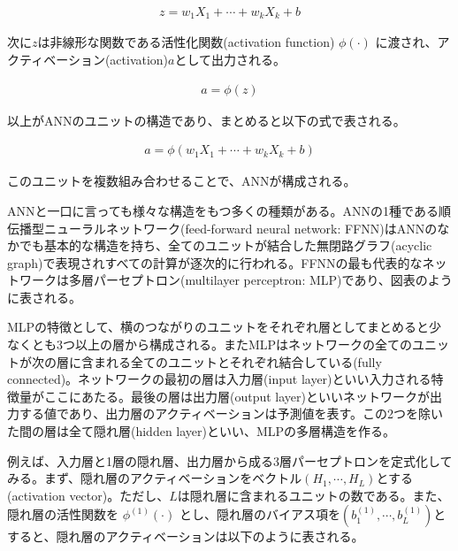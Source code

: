 \documentclass[a4paper, 12pt]{jsreport}
\begin{document}
\begin{equation}
  \begin{split}
    z = w_1 X_1 + \cdots + w_k X_k + b
  \end{split}
\end{equation}

次に$z$は非線形な関数である活性化関数(activation function) $\phi(\cdot)$ に渡され、アクティベーション(activation)$a$として出力される。

\begin{equation}
  \begin{split}
    a = \phi(z)
  \end{split}
\end{equation}

以上がANNのユニットの構造であり、まとめると以下の式で表される。

\begin{equation}
  \begin{split}
    a = \phi(w_1 X_1 + \cdots + w_k X_k + b)
  \end{split}
\end{equation}


このユニットを複数組み合わせることで、ANNが構成される。

ANNと一口に言っても様々な構造をもつ多くの種類がある。ANNの1種である順伝播型ニューラルネットワーク(feed-forward neural network: FFNN)はANNのなかでも基本的な構造を持ち、全てのユニットが結合した無閉路グラフ(acyclic graph)で表現されすべての計算が逐次的に行われる。FFNNの最も代表的なネットワークは多層パーセプトロン(multilayer perceptron: MLP)であり、図表のように表される。


MLPの特徴として、横のつながりのユニットをそれぞれ層としてまとめると少なくとも3つ以上の層から構成される。またMLPはネットワークの全てのユニットが次の層に含まれる全てのユニットとそれぞれ結合している(fully connected)。ネットワークの最初の層は入力層(input layer)といい入力される特徴量がここにあたる。最後の層は出力層(output layer)といいネットワークが出力する値であり、出力層のアクティベーションは予測値を表す。この2つを除いた間の層は全て隠れ層(hidden layer)といい、MLPの多層構造を作る。

例えば、入力層と1層の隠れ層、出力層から成る3層パーセプトロンを定式化してみる。まず、隠れ層のアクティベーションをベクトル$(H_1, \cdots, H_L)$とする(activation vector)。ただし、$L$は隠れ層に含まれるユニットの数である。また、隠れ層の活性関数を $\phi^{(1)}(\cdot)$ とし、隠れ層のバイアス項を$(b^{(1)}_1, \cdots, b^{(1)}_L)$とすると、隠れ層のアクティベーションは以下のように表される。
\end{document}
